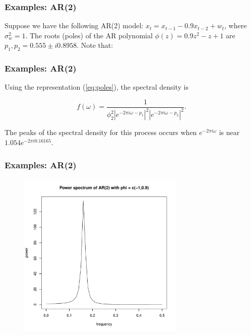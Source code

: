 \documentclass[%
xcolor=pdftex]{beamer}
\begin{document}







\begin{frame}
\frametitle{Examples: AR(2)}

Suppose we have the following AR(2) model: $x_t = x_{t-1} - 0.9 x_{t-2} + w_t$, where $\sigma_w^2 = 1$. The roots (poles) of the AR polynomial $\phi(z) = 0.9z^2 - z + 1$ are $p_1, p_2 = 0.555 \pm i0.8958$. Note that:

\vspace{40mm}

\end{frame}

\begin{frame}
\frametitle{Examples: AR(2)}

Using the representation (\ref{eq:poles}), the spectral density is

$$
f(\omega) = \frac{1}{\phi_2^2 \left \lvert e^{-2 \pi i \omega - p_1} \right \rvert^2 \left \lvert e^{-2 \pi i \omega - p_2} \right \rvert^2}.
$$

The peaks of the spectral density for this process occurs when $e^{-2 \pi i \omega}$ is near $1.054e^{-2 \pi i 0.16165}$.

\end{frame}

\begin{frame}
\frametitle{Examples: AR(2)}

\includegraphics[width=100mm, height=80mm]{ar2power.pdf}

\end{frame}
\end{document}

